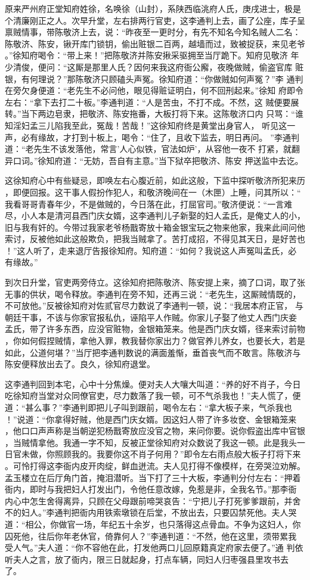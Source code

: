 原来严州府正堂知府姓徐，名唤徐（山封），系陕西临洮府人氏，庚戌进士，极是
个清廉刚正之人。次早升堂，左右排两行官吏，这李通判上去，画了公座，库子呈
禀贼情事，带陈敬济上去，说：“昨夜至一更时分，有先不知名今知名贼人二名：
陈敬济、陈安，锹开库门锁钥，偷出赃银二百两，越墙而过，致被捉获，来见老爷
。”徐知府喝令：“带上来！”把陈敬济并陈安揪采驱拥至当厅跪下。知府见敬济
年少清俊，便问：“这厮是那里人氏？因何来我这府衙公廨，夜晚做贼，偷盗官库
赃银，有何理说？”那陈敬济只顾磕头声冤。徐知府道：“你做贼如何声冤？”李
通判在旁欠身便道：“老先生不必问他，眼见得赃证明白，何不回刑起来。”徐知
府即令左右：“拿下去打二十板。”李通判道：“人是苦虫，不打不成。不然，这
贼便要展转。”当下两边皂隶，把敬济、陈安拖番，大板打将下来。这陈敬济口内
只骂：“谁知淫妇孟三儿陷我至此，冤哉！苦哉！”这徐知府终是黄堂出身官人，
听见这一声，必有缘故，才打到十板上，喝令：“住了，且收下监去，明日再问。
”李通判道：“老先生不该发落他，常言'人心似铁，官法如炉'，从容他一夜不
打紧，就翻异口词。”徐知府道：“无妨，吾自有主意。”当下狱卒把敬济、陈安
押送监中去讫。

这徐知府心中有些疑忌，即唤左右心腹近前，如此这般，下监中探听敬济所犯来历
，即便回报。这干事人假扮作犯人，和敬济晚间在一（木匣）上睡，问其所以：“
我看哥哥青春年少，不是做贼的，今日落在此，打屈官司。”敬济便说：“一言难
尽，小人本是清河县西门庆女婿，这李通判儿子新娶的妇人孟氏，是俺丈人的小，
旧与我有奸的。今带过我家老爷杨戬寄放十箱金银宝玩之物来他家，我来此间问他
索讨，反被他如此这般欺负，把我当贼拿了。苦打成招，不得见其天日，是好苦也
！”这人听了，走来退厅告报徐知府。知府道：“如何？我说这人声冤叫孟氏，必
有缘故。”

到次日升堂，官吏两旁侍立。这徐知府把陈敬济、陈安提上来，摘了口词，取了张
无事的供状，喝令释放。李通判在旁不知，还再三说：“老先生，这厮贼情既的，
不可放他。”反被徐知府对佐贰官尽力数说了李通判一顿，说：“我居本府正官，
与朝廷干事，不该与你家官报私仇，诬陷平人作贼。你家儿子娶了他丈人西门庆妾
孟氏，带了许多东西，应没官赃物，金银箱笼来。他是西门庆女婿，径来索讨前物
，你如何假捏贼情，拿他入罪，教我替你家出力？做官养儿养女，也要长大，若是
如此，公道何堪？”当厅把李通判数说的满面羞惭，垂首丧气而不敢言。陈敬济与
陈安便释放出去了。良久，徐知府退堂。

这李通判回到本宅，心中十分焦燥。便对夫人大嚷大叫道：“养的好不肖子，今日
吃徐知府当堂对众同僚官吏，尽力数落了我一顿，可不气杀我也！”夫人慌了，便
道：“甚么事？”李通判即把儿子叫到跟前，喝令左右：“拿大板子来，气杀我也
！”说道：“你拿得好贼，他是西门庆女婿。因这妇人带了许多妆奁、金银箱笼来
，他口口声声称是当朝逆犯杨戬寄放应没官之物，来问你要。说你假盗出库中官银
，当贼情拿他。我通一字不知，反被正堂徐知府对众数说了我这一顿。此是我头一
日官未做，你照顾我的。我要你这不肖子何用？”即令左右雨点般大板子打将下来
。可怜打得这李衙内皮开肉绽，鲜血迸流。夫人见打得不像模样，在旁哭泣劝解。
孟玉楼立在后厅角门首，掩泪潜听。当下打了三十大板，李通判分付左右：“押着
衙内，即时与我把妇人打发出门，令他任意改嫁，免惹是非，全我名节。”那李衙
内心中怎生舍得离异，只顾在父母跟前啼哭哀告：“宁把儿子打死爹爹跟前，并舍
不的妇人。”李通判把衙内用铁索墩锁在后堂，不放出去，只要囚禁死他。夫人哭
道：“相公，你做官一场，年纪五十余岁，也只落得这点骨血。不争为这妇人，你
囚死他，往后你年老休官，倚靠何人？”李通判道：“不然，他在这里，须带累我
受人气。”夫人道：“你不容他在此，打发他两口儿回原籍真定府家去便了。”通
判依听夫人之言，放了衙内，限三日就起身，打点车辆，同妇人归枣强县里攻书去
了。

